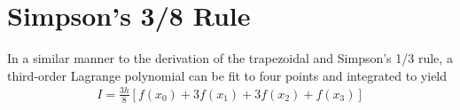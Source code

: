 \documentclass[book.tex]{subfiles}
\begin{document}

%
%
%
%

\section{Simpson's 3/8 Rule}
In a similar manner to the derivation of the trapezoidal and Simpson's 1/3 rule, a third-order Lagrange polynomial can be fit to four points and integrated to yield
\begin{align}
I = \frac{3h}{8}[f(x_0) + 3f(x_1) + 3f(x_2) + f(x_3)]
\end{align}
\end{document}
